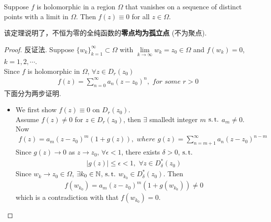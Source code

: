 \begin{thm}\label{thm 6.3.1}
	Suppose $f$ is holomorphic in a region $\Omega$ that vanishes on a sequence of distinct points with a limit in $\Omega$. Then $f(z) \equiv 0$ for all $z \in \Omega$.
	
	\vspace{1em}
	\begin{rmk}
		该定理说明了，不恒为零的全纯函数的\textbf{零点均为孤立点} (不为聚点).
	\end{rmk}
	
	\vspace{1em}
	\begin{proof}
		反证法. Suppose $\{ w_k \}_{k = 1}^{\infty} \subset \Omega$ with $\underset{k \to \infty}{\lim}{w_k} = z_0 \in \Omega$ and $f(w_k) = 0$, $k = 1 , 2 , \cdots$. \\
		Since $f$ is holomorphic in $\Omega$, $\forall z \in D_{r}(z_0)$
		\begin{align}
			f(z) = \sum_{n = 0}^{\infty}{a_n (z - z_0)^n} , \,\, for \,\, some \,\, r > 0
		\end{align}
		下面分为两步证明.
		\begin{itemize}
			\item We first show $f(z) \equiv 0$ on $D_{r}(z_0)$. \\
			Assume $f(z) \neq 0$ for $z \in D_{r}(z_0)$, then $\exists$ smalledt integer $m$ $\operatorname{s.t.}$ $a_m \neq 0$. Now
			\begin{align}
				f(z) = a_m (z - z_0)^m (1 + g(z)) , \,\, where \,\, g(z) = \sum_{n = m + 1}^{\infty}{a_n (z - z_0)^{n - m}}
			\end{align}
			Since $g(z) \to 0$ as $z \to z_0$, $\forall \epsilon < 1$, there exists $\delta > 0$, $\operatorname{s.t.}$
			\begin{align}
				\left| g(z) \right| \leq \epsilon < 1 , \,\, \forall z \in D_{\delta}^{*}(z_0)
			\end{align}
			Since $w_k \to z_0 \in \Omega$, $\exists k_0 \in \mathbb{N}$, $\operatorname{s.t.}$ $w_{k_0} \in D_{\delta}^{*}(z_0)$. Then
			\begin{align}
				f(w_{k_0}) = a_m (z - z_0)^m (1 + g(w_{k_0})) \neq 0
			\end{align}
			which is a contradiction with that $f(w_{k_0}) = 0$.
			

\end{itemize}
\end{proof}
\end{thm}
